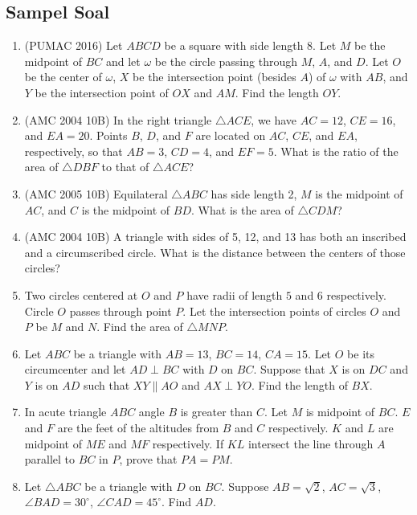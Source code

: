 \documentclass[11pt]{scrartcl}
\begin{document}
\subsection{Sampel Soal}
\begin{enumerate}
    \item (PUMAC 2016) Let $ABCD$ be a square with side length 8. Let $M$ be the midpoint of $BC$ and let $\omega$ be the circle passing through $M$, $A$, and $D$. Let $O$ be the center of $\omega$, $X$ be the intersection point (besides $A$) of $\omega$ with $AB$, and $Y$ be the intersection point of $OX$ and $AM$. Find the length $OY$.

    \item (AMC 2004 10B) In the right triangle $\triangle ACE$, we have $AC = 12$, $CE = 16$, and $EA = 20$. Points $B$, $D$, and $F$ are located on $AC$, $CE$, and $EA$, respectively, so that $AB = 3$, $CD = 4$, and $EF = 5$. What is the ratio of the area of $\triangle DBF$ to that of $\triangle ACE$?

    \item (AMC 2005 10B) Equilateral $\triangle ABC$ has side length 2, $M$ is the midpoint of $AC$, and $C$ is the midpoint of $BD$. What is the area of $\triangle CDM$?

    \item (AMC 2004 10B) A triangle with sides of 5, 12, and 13 has both an inscribed and a circumscribed circle. What is the distance between the centers of those circles?

    \item Two circles centered at $O$ and $P$ have radii of length $5$ and $6$ respectively. Circle $O$ passes through point $P$. Let the intersection points of circles $O$ and $P$ be $M$ and $N$. Find the area of $\triangle MNP$.

    \item Let $ABC$ be a triangle with $AB = 13$, $BC = 14$, $CA = 15$. Let $O$ be its circumcenter and let $AD \perp BC$ with $D$ on $BC$. Suppose that $X$ is on $DC$ and $Y$ is on $AD$ such that $XY \parallel AO$ and $AX \perp YO$. Find the length of $BX$.

    \item In acute triangle $ABC$ angle $B$ is greater than $C$. Let $M$ is midpoint of $BC$. $E$ and $F$ are the feet of the altitudes from $B$ and $C$ respectively. $K$ and $L$ are midpoint of $ME$ and $MF$ respectively. If $KL$ intersect the line through $A$ parallel to $BC$ in $P$, prove that $PA = PM$.

    \item Let $\triangle ABC$ be a triangle with $D$ on $BC$. Suppose $AB = \sqrt{2}$, $AC = \sqrt{3}$, $\angle BAD = 30^\circ$, $\angle CAD = 45^\circ$. Find $AD$.


\end{enumerate}
\end{document}
